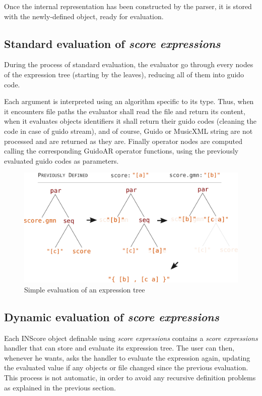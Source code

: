 \documentclass{article}
\newcommand{\sExpr}{\emph{score expressions} }
\begin{document}
Once the internal representation has been constructed by the parser, it is stored with the newly-defined object, ready for evaluation.

\subsection{Standard evaluation of \sExpr}
During the process of standard evaluation, the evaluator go through every nodes of the expression tree (starting by the leaves), reducing all of them into guido code.

Each argument is interpreted using an algorithm specific to its type. Thus, when it encounters file paths the evaluator shall read the file and return its content, when it evaluates objects identifiers it shall return their guido codes (cleaning the code in case of guido stream), and of course, Guido or MusicXML string are not processed and are returned as they are. Finally operator nodes are computed calling the corresponding GuidoAR operator functions, using the previously evaluated guido codes as parameters.

\begin{figure}[th]
\centering
\includegraphics[width=1\columnwidth]{imgs/classicEval}
\caption{Simple evaluation of an expression tree
\label{fig:example}}
\end{figure}




\subsection{Dynamic evaluation of \sExpr}

Each INScore object definable using \sExpr contains a \sExpr handler that can store and evaluate  its expression tree. The user can then, whenever he wants, asks the handler to evaluate the expression again, updating the evaluated value if any objects or file changed since the previous evaluation. This process is not automatic, in order to avoid any recursive definition problems as explained in the previous section.
\end{document}
